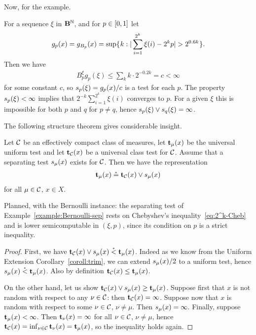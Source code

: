 Now, for the example.

\begin{example}\label{example:Bernoulli-sep}
For a sequence \( \xi \) in \( \mathbf{B}^{\mathbb{N}} \), and for \( p\in[0,1] \) let
 \begin{align*}
   g_{p}(x) = g_{B_{p}}(x) = \sup\setof{k: |\sum_{i=1}^{2^{k}}\xi(i)-2^{k}p|> 2^{0.6k}}.
 \end{align*}
Then we have
 \begin{align*}
   B_{p}^{\xi}g_{p}(\xi) \le \sum_{k} k\cdot 2^{-0.2 k} = c<\infty
 \end{align*}
for some constant \( c \), so \( s_{p}(\xi)=g_{p}(x)/c \) is a test for each \( p \).
The property \( s_{p}(\xi)<\infty \) implies that \( 2^{-k}\sum_{i=1}^{2^{k}}\xi(i) \)
converges to \( p \).
For a given \( \xi \) this is impossible for both \( p \) and \( q \) for \( p\ne q \), hence
\( s_{p}(\xi)\lor s_{q}(\xi)=\infty \).
\end{example}

The following structure theorem gives considerable insight.

\begin{theorem}\label{thm:test-sep}
Let \( \mathcal{C} \) be an effectively compact class of measures,
let \( \mathbf{t}_{\mu}(x) \) be the universal uniform test and
let \( \mathbf{t}_{\mathcal{C}}(x) \) be a universal class test for \( \mathcal{C} \).
Assume that a separating test \( s_{\mu}(x) \) exists for \( \mathcal{C} \).
Then we have the representation
 \begin{align*}
  \mathbf{t}_{\mu}(x) \stackrel{{}_*}{=} \mathbf{t}_{\mathcal{C}}(x)\lor s_{\mu}(x)
 \end{align*}
for all \( \mu\in\mathcal{C} \), \( x\in X \).
\end{theorem}

\begin{formalization}
Planned, with the Bernoulli instance: the separating test of Example~\ref{example:Bernoulli-sep}
rests on Chebyshev's inequality~\eqref{eq:2^k-Cheb} and is lower semicomputable in $(\xi,p)$, since its
condition on $p$ is a strict inequality.
\end{formalization}
 \begin{proof}
First, we have \( \mathbf{t}_{\mathcal{C}}(x)\lor s_{\mu}(x) \stackrel{{}_*}{<} \mathbf{t}_{\mu}(x) \).
Indeed as we know from the Uniform Extension Corollary~\ref{coroll:trim}, we can
extend \( s_{\mu}(x)/2 \) to a uniform test, hence \( s_{\mu}(x)\stackrel{{}_*}{<} \mathbf{t}_{\mu}(x) \).
Also by definition \( \mathbf{t}_{\mathcal{C}}(x)\le \mathbf{t}_{\mu}(x) \).

On the other hand, let us show \( \mathbf{t}_{\mathcal{C}}(x)\lor s_{\mu}(x) \ge \mathbf{t}_{\mu}(x) \).
Suppose first that 
\( x \) is not random with respect to any \( \nu\in\mathcal{C} \): then \( \mathbf{t}_{\mathcal{C}}(x)=\infty \).
Suppose now that \( x \) is random with respect to some \( \nu\in\mathcal{C} \), 
\( \nu\ne\mu \).
Then \( s_{\mu}(x)=\infty \).
Finally, suppose \( \mathbf{t}_{\mu}(x)<\infty \).
Then \( \mathbf{t}_{\nu}(x)=\infty \) for all \( \nu\in\mathcal{C} \), \( \nu\ne\mu \), hence
\( \mathbf{t}_{\mathcal{C}}(x) = \inf_{\nu\in\mathcal{C}}\mathbf{t}_{\nu}(x) = \mathbf{t}_{\mu}(x) \), so
the inequality holds again.
 \end{proof}

